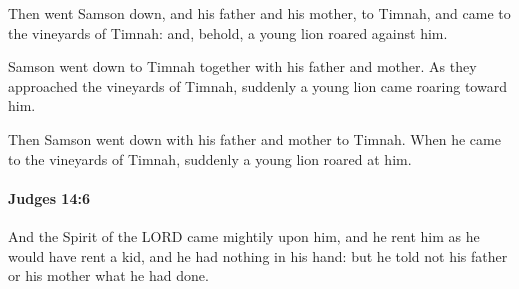 			\begin{versebox}
					\item[BHS] 
					\item[ASV] Then went Samson down, and his father and his mother, to Timnah, and came to the vineyards of Timnah: and, behold, a young lion roared against him.
					\item[NIV] Samson went down to Timnah together with his father and mother. As they approached the vineyards of Timnah, suddenly a young lion came roaring toward him.
					\item[NRSV] Then Samson went down with his father and mother to Timnah. When he came to the vineyards of Timnah, suddenly a young lion roared at him.
			\end{versebox}

		\paragraph{Judges 14:6} %
			\label{JUDGES-14-6}

			And the Spirit of the LORD came mightily upon him, and he rent him as he would have rent a kid, and he had nothing in his hand: but he told not his father or his mother what he had done.

